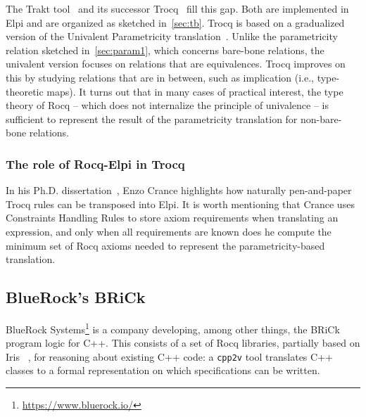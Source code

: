 \documentclass[a4paper, 11pt]{book}
\begin{document}
The Trakt tool~\cite{DBLP:conf/cpp/Blot0CPKMV23} and its successor
Trocq~\cite{10.1007/978-3-031-57262-3_10} fill this gap. Both are implemented
in Elpi and are organized as sketched in~\cref{sec:tb}. Trocq is based on a
gradualized version of the Univalent Parametricity
translation~\cite{10.1145/3429979}. Unlike the parametricity relation
sketched in~\cref{sec:param1}, which concerns bare-bone relations, the
univalent version focuses on relations that are equivalences. Trocq improves
on this by studying relations that are in between, such as implication (i.e.,
type-theoretic maps). It turns out that in many cases of practical interest,
the type theory of Rocq -- which does not internalize the principle of
univalence -- is sufficient to represent the result of the parametricity
translation for non-bare-bone relations.

\subsubsection{The role of Rocq-Elpi in Trocq}

In his Ph.D. dissertation~\cite[Page 115]{enzo}, Enzo Crance highlights how naturally
pen-and-paper Trocq rules can be transposed into Elpi. It is worth mentioning
that Crance uses Constraints Handling Rules to store axiom requirements when
translating an expression, and only when all requirements are known does he
compute the minimum set of Rocq axioms needed to represent the
parametricity-based translation.



\subsection{BlueRock's BRiCk}


BlueRock Systems\footnote{\url{https://www.bluerock.io/}} is a company
developing, among other things, the BRiCk program logic for C++. This consists
of a set of Rocq libraries, partially based on Iris
~\cite{10.1145/2676726.2676980,10.1007/978-3-662-54434-1_26}, for reasoning
about existing C++ code: a \texttt{cpp2v} tool translates C++ classes to a
formal representation on which specifications can be written.
\end{document}
